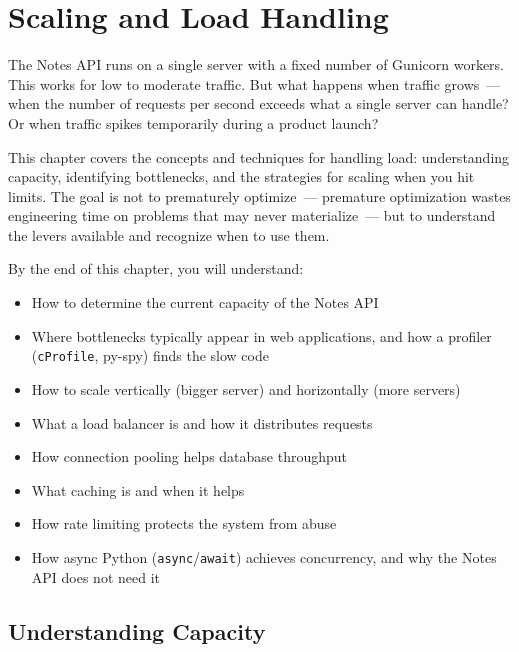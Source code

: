 \setcounter{chapter}{35}
\chapter{Scaling and Load Handling}\label{ch:36-scaling-load}

\chapterrule

The Notes API runs on a single server with a fixed number of Gunicorn workers. This works for low to moderate traffic. But what happens when traffic grows~--- when the number of requests per second exceeds what a single server can handle? Or when traffic spikes temporarily during a product launch?

This chapter covers the concepts and techniques for handling load: understanding capacity, identifying bottlenecks, and the strategies for scaling when you hit limits. The goal is not to prematurely optimize~--- premature optimization wastes engineering time on problems that may never materialize~--- but to understand the levers available and recognize when to use them.

\begin{objectives}

By the end of this chapter, you will understand:

\begin{itemize}
\tightlist
\item
  How to determine the current capacity of the Notes API
\item
  Where bottlenecks typically appear in web applications, and how a profiler (\texttt{cProfile}, py-spy) finds the slow code
\item
  How to scale vertically (bigger server) and horizontally (more servers)
\item
  What a load balancer is and how it distributes requests
\item
  How connection pooling helps database throughput
\item
  What caching is and when it helps
\item
  How rate limiting protects the system from abuse
\item
  How async Python (\texttt{async}/\texttt{await}) achieves concurrency, and why the Notes API does not need it
\end{itemize}

\end{objectives}

\setcounter{section}{0}
\section{Understanding Capacity}\label{36-scaling-load:361-understanding-capacity}


